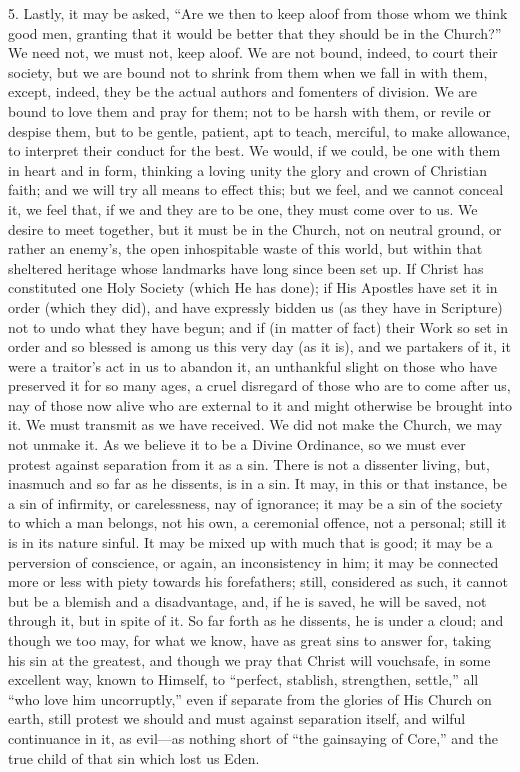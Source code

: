 5. Lastly, it may be asked, ``Are we then to keep aloof from
those whom we think good men, granting that it would be better that
they should be in the Church?'' We need not, we must not, keep
aloof. We are not bound, indeed, to court their society, but we are
bound not to shrink from them when we fall in with them, except,
indeed, they be the actual authors and fomenters of division. We are
bound to love them and pray for them; not to be harsh with them, or
revile or despise them, but to be gentle, patient, apt to teach,
merciful, to make allowance, to interpret their conduct for the best.
We would, if we could, be one with them in heart and in form, thinking
a loving unity the glory and crown of Christian faith; and we will try
all means to effect this; but we feel, and we cannot conceal it, we
feel that, if we and they are to be one, they must come over to us. We
desire to meet together, but it must be in the Church, not on neutral
ground, or rather an enemy's, the open inhospitable waste of this
world, but within that sheltered heritage whose landmarks have long
since been set up. If Christ has constituted one Holy Society (which
He has done); if His Apostles have set it in order (which they did),
and have expressly bidden us (as they have in Scripture) not to undo
what they have begun; and if (in matter of fact) their Work so set in
order and so blessed is among us this very day (as it is), and we
partakers of it, it were a traitor's act in us to abandon it, an
unthankful slight on those who have preserved it for so many ages, a
cruel disregard of those who are to come after us, nay of those now
alive who are external to it and might otherwise be brought into it.
We must transmit as we have received. We did not make the Church, we
may not unmake it. As we believe it to be a Divine Ordinance, so we
must ever protest against separation from it as a sin. There is not a
dissenter living, but, inasmuch and so far as he dissents, is in a
sin. It may, in this or that instance, be a sin of infirmity, or
carelessness, nay of ignorance; it may be a sin of the society to
which a man belongs, not his own, a ceremonial offence, not a
personal; still it is in its nature sinful. It may be mixed up with
much that is good; it may be a perversion of conscience, or again, an
inconsistency in him; it may be connected more or less with piety
towards his forefathers; still, considered as such, it cannot but be a
blemish and a disadvantage, and, if he is saved, he will be saved, not
through it, but in spite of it. So far forth as he dissents, he is
under a cloud; and though we too may, for what we know, have as great
sins to answer for, taking his sin at the greatest, and though we pray
that Christ will vouchsafe, in some excellent way, known to Himself,
to ``perfect, stablish, strengthen, settle,'' all ``who
love him uncorruptly,'' even if separate from the glories of His
Church on earth, still protest we should and must against separation
itself, and wilful continuance in it, as evil—as nothing short of
``the gainsaying of Core,'' and the true child of that sin
which lost us Eden.

